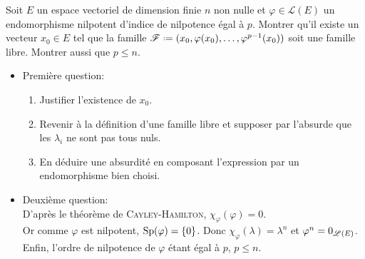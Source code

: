 \begin{exercice}
    Soit $E$ un espace vectoriel de dimension finie $n$ non nulle et $\varphi \in \mathscr{L}(E)$ un endomorphisme nilpotent d'indice de nilpotence égal à $p$. Montrer qu'il existe un vecteur $x_0 \in E$ tel que la famille $\mathscr{F} \defeq (x_0, \varphi(x_0), \dots, \varphi^{p-1}(x_0))$ soit une famille libre. Montrer aussi que $p \leqslant n$. 
\end{exercice}    

\begin{solution}
    \begin{itemize}
        \item Première question:
        \begin{enumerate}
            \item Justifier l'existence de $x_0$.
            \item Revenir à la définition d'une famille libre et supposer par l'absurde que les $\lambda_i$ ne sont pas tous nuls. 
            \item En déduire une absurdité en composant l'expression par un endomorphisme bien choisi.
        \end{enumerate}
        \item Deuxième question:\\
            D'après le théorème de \textsc{Cayley}-\textsc{Hamilton}, $\chi_{\varphi}(\varphi) = 0$. \\
            Or comme $\varphi$ est nilpotent, $\mathrm{Sp}(\varphi) = \{0\}$. Donc $\chi_{\varphi}(\lambda) = \lambda^n$ et $\varphi^n = 0_{\mathscr{L}(E)}$. Enfin, l'ordre de nilpotence de $\varphi$ étant égal à $p$, $p \leqslant n$.
    \end{itemize}
\end{solution}
